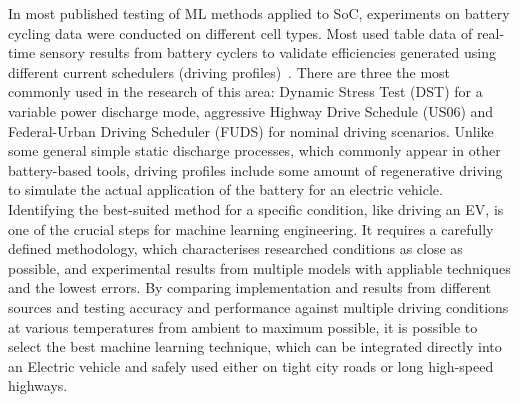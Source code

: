 %
In most published testing of ML methods applied to SoC, experiments on battery cycling data were conducted on different cell types.
Most used table data of real-time sensory results from battery cyclers to validate efficiencies generated using different current schedulers (driving profiles)~\cite{Chemali2017,song_lithium-ion_2018,mamo_long_2020,jiao_gru-rnn_2020,xiao_accurate_2019}.
There are three the most commonly used in the research of this area: Dynamic Stress Test (DST) for a variable power discharge mode, aggressive Highway Drive Schedule (US06) and Federal-Urban Driving Scheduler (FUDS) for nominal driving scenarios.
Unlike some general simple static discharge processes, which commonly appear in other battery-based tools, driving profiles include some amount of regenerative driving to simulate the actual application of the battery for an electric vehicle.
%
%
Identifying the best-suited method for a specific condition, like driving an EV, is one of the crucial steps for machine learning engineering.
It requires a carefully defined methodology, which characterises researched conditions as close as possible, and experimental results from multiple models with appliable techniques and the lowest errors.
By comparing implementation and results from different sources and testing accuracy and performance against multiple driving conditions at various temperatures from ambient to maximum possible, it is possible to select the best machine learning technique, which can be integrated directly into an Electric vehicle and safely used either on tight city roads or long high-speed highways.
